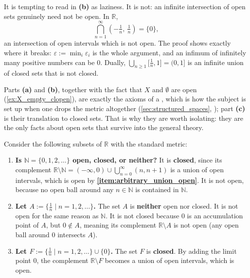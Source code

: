 \begin{importantremark}
\label{rem:finiteness_is_necessary}
It is tempting to read  in \textbf{(b)} as laziness. It is not: an infinite
intersection of open sets genuinely need not be open. In $\mathbb{R}$,
\[\bigcap_{n=1}^{\infty}\left(-\tfrac1n,\ \tfrac1n\right) = \{0\},\]
an intersection of open intervals which is not open. The proof shows exactly where it breaks:
$\varepsilon := \min_i\varepsilon_i$ is the whole argument, and an infimum of infinitely many
positive numbers can be $0$. Dually, $\bigcup_{n\geq1}\big[\tfrac1n,1\big] = (0,1]$ is an
infinite union of closed sets that is not closed.

\begin{ainote}
Parts \textbf{(a)} and \textbf{(b)}, together with the fact that $X$ and $\emptyset$ are open
(\cref{ex:X_empty_clopen}), are exactly the axioms of a , which is how the
subject is set up when one drops the metric altogether (\cref{sec:structured_spaces},
); part \textbf{(c)} is their translation to closed sets. That is why they
are worth isolating: they are the only facts about open sets that survive into the general
theory.
\end{ainote}
\end{importantremark}

\begin{example}
\label{ex:open_closed_R}
Consider the following subsets of $\mathbb{R}$ with the standard metric:
\begin{enumerate}[label=\textbf{(\alph*)}]
  \item \textbf{Is $\mathbb{N} = \{0,1,2,\dots\}$ open, closed, or neither?} It is
    \textbf{closed}, since its complement
    $\mathbb{R} \setminus \mathbb{N} = (-\infty, 0) \cup \bigcup_{n=0}^\infty (n, n+1)$
    is a union of open intervals, which is open by
    \textbf{\ref{item:arbitrary_union_open}}. It is not open,
    because no open ball around any $n \in \mathbb{N}$ is contained in $\mathbb{N}$.
  \item \textbf{Let $A := \{\frac{1}{n} \mid n = 1, 2, \dots\}$.} The set $A$ is \textbf{neither}
    open nor closed. It is not open for the same reason as $\mathbb{N}$. It is not closed because
    $0$ is an accumulation point of $A$, but $0 \notin A$, meaning its complement
    $\mathbb{R} \setminus A$ is not open (any open ball around $0$ intersects $A$).
  \item \textbf{Let $F := \{\frac{1}{n} \mid n = 1, 2, \dots\} \cup \{0\}$.} The set $F$ is
    \textbf{closed}. By adding the limit point $0$, the complement $\mathbb{R} \setminus F$
    becomes a union of open intervals, which is open.
\end{enumerate}
\end{example}


